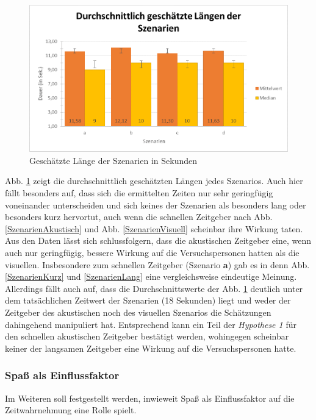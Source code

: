 \documentclass{Paper}
\begin{document}
     \begin{figure}[H]
	\includegraphics[scale=0.7]{../Diagramme/einschaetzung/laenge_durchschnitt_alle.png}
	\caption{Geschätzte Länge der Szenarien in Sekunden}
	\label{LaengeSzenarien}
\end{figure}

Abb. \ref{LaengeSzenarien} zeigt die durchschnittlich geschätzten Längen jedes Szenarios. Auch hier fällt besonders auf, dass sich die ermittelten Zeiten nur sehr geringfügig voneinander unterscheiden und sich keines der Szenarien als besonders lang oder besonders kurz hervortut, auch wenn die schnellen Zeitgeber nach Abb. \ref{SzenarienAkustisch} und Abb. \ref{SzenarienVisuell} scheinbar ihre Wirkung taten.\\
Aus den Daten lässt sich schlussfolgern, dass die akustischen Zeitgeber eine, wenn auch nur geringfügig, bessere Wirkung auf die Versuchspersonen hatten als die visuellen. Insbesondere zum schnellen Zeitgeber (Szenario \textbf{a}) gab es in denn Abb. \ref{SzenarienKurz} und \ref{SzenarienLang} eine vergleichsweise eindeutige Meinung. Allerdings fällt auch auf, dass die Durchschnittswerte der Abb. \ref{LaengeSzenarien} deutlich unter dem tatsächlichen Zeitwert der Szenarien (18 Sekunden) liegt und weder der Zeitgeber des akustischen noch des visuellen Szenarios die Schätzungen dahingehend manipuliert hat. Entsprechend kann ein Teil der \textit{Hypothese 1} für den schnellen akustischen Zeitgeber bestätigt werden, wohingegen scheinbar keiner der langsamen Zeitgeber eine Wirkung auf die Versuchspersonen hatte.
      
\subsubsection{Spaß als Einflussfaktor}
Im Weiteren soll festgestellt werden, inwieweit Spaß als Einflussfaktor auf die Zeitwahrnehmung eine Rolle spielt.
\end{document}
